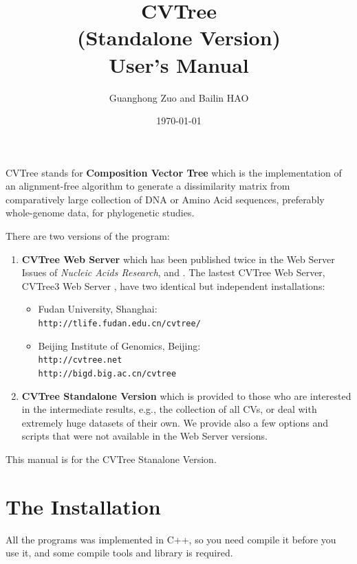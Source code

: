 \documentclass[a4paper,12pt]{article}
\begin{document}
\title{CVTree \\\Large{(Standalone Version)}\\User's Manual}
\author{Guanghong Zuo and Bailin HAO}
\date{\today}
\maketitle


CVTree stands for {\bf Composition Vector Tree} which is the
implementation of an alignment-free algorithm to generate a
dissimilarity matrix from comparatively large collection of DNA or Amino
Acid sequences, preferably whole-genome data, for phylogenetic studies.

There are two versions of the program:
\begin{enumerate}\itemsep 0pt
	\item {\bf CVTree Web Server} which has been published twice in the Web
	   Server Issues of {\it Nucleic Acids Research}, \cite{qlh04}
	   and \cite{xh09}. The lastest CVTree Web Server, CVTree3 Web
	   Server \cite{zh15}, have two identical but independent installations:
	   \begin{itemize}
		   \item Fudan University, Shanghai: \\
		   {\tt http://tlife.fudan.edu.cn/cvtree/}
		   \item Beijing Institute of Genomics, Beijing:\\
		   {\tt http://cvtree.net
		   \\ http://bigd.big.ac.cn/cvtree}
	   \end{itemize}

	\item {\bf CVTree Standalone Version} which is provided to those who are
	   interested in the intermediate results, e.g., the collection of all
	   CVs, or deal with extremely huge datasets of their own. We provide
	   also a few options and scripts that were not available in the Web
	   Server versions.
\end{enumerate}

This manual is for the CVTree Stanalone Version.

\section{The Installation}
All the programs was implemented in C++, so you need compile it before you use
it, and some compile tools and library is required.
\end{document}
